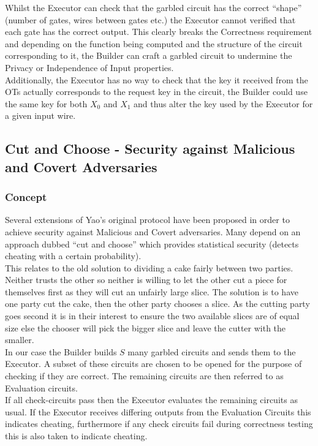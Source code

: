 \documentclass[ %
                    author={Nicholas Tutte},
                supervisor={Prof. Nigel Smart},
                    degree={MEng},
                     title={Secure Two Party Computation},
                  subtitle={A practical comparison of recent protocols},
                      type={Research - GG1K},
                      year={2015} ]{dissertation}
\begin{document}
			Whilst the Executor can check that the garbled circuit has the correct ``shape'' (number of gates, wires between gates etc.) the Executor cannot verified that each gate has the correct output. This clearly breaks the Correctness requirement and depending on the function being computed and the structure of the circuit corresponding to it, the Builder can craft a garbled circuit to undermine the Privacy or Independence of Input properties.\\

			Additionally, the Executor has no way to check that the key it received from the OTs actually corresponds to the request key in the circuit, the Builder could use the same key for both $X_0$ and $X_1$ and thus alter the key used by the Executor for a given input wire.


		\subsection{Cut and Choose - Security against Malicious and Covert Adversaries} \label{sub:YaoMalicious}
			\subsubsection{Concept}
				Several extensions of Yao's original protocol have been proposed in order to achieve security against Malicious and Covert adversaries. Many depend on an approach dubbed ``cut and choose'' which provides statistical security (detects cheating with a certain probability).\\

				This relates to the old solution to dividing a cake fairly between two parties. Neither trusts the other so neither is willing to let the other cut a piece for themselves first as they will cut an unfairly large slice. The solution is to have one party cut the cake, then the other party chooses a slice. As the cutting party goes second it is in their interest to ensure the two available slices are of equal size else the chooser will pick the bigger slice and leave the cutter with the smaller.\\

				In our case the Builder builds $S$ many garbled circuits and sends them to the Executor. A subset of these circuits are chosen to be opened for the purpose of checking if they are correct. The remaining circuits are then referred to as Evaluation circuits.\\

				If all check-circuits pass then the Executor evaluates the remaining circuits as usual. If the Executor receives differing outputs from the Evaluation Circuits this indicates cheating, furthermore if any check circuits fail during correctness testing this is also taken to indicate cheating.\\
\end{document}
